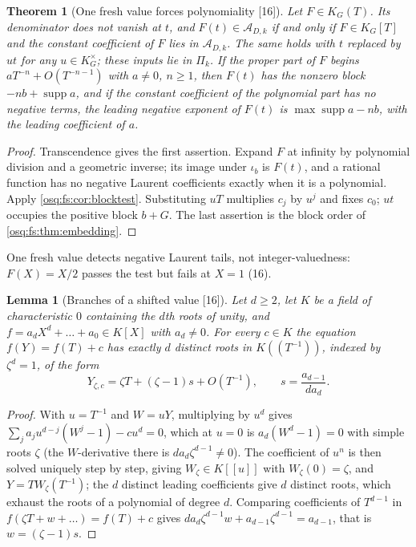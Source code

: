 \documentclass[11pt,letterpaper]{article}
\numberwithin{equation}{section}
\newtheorem{theorem}{Theorem}[section]
\newtheorem{lemma}[lemma]{Lemma}
\theoremstyle{definition}
\theoremstyle{remark}
\theoremstyle{plain}
\newcommand{\A}{\mathcal A}          %
\newcommand{\supp}{\operatorname{supp}}
\newcommand{\src}[1]{\textup{\textsf{[#1]}}}
\begin{document}
\begin{theorem}[One fresh value forces polynomiality \src{16}]\label{osq:fs:thm:onepoint}
Let $F\in K_G(T)$. Its denominator does not vanish at $t$, and $F(t)\in\A_{D,k}$ if and only if $F\in K_G[T]$ and the constant
coefficient of $F$ lies in $\A_{D,k}$. The same holds with $t$ replaced by $ut$ for any $u\in K_G^\times$; these inputs lie in $\Pi_k$.
If the proper part of $F$ begins $aT^{-n}+O(T^{-n-1})$ with $a\ne0$, $n\ge1$, then $F(t)$ has the nonzero block $-nb+\supp a$, and if
the constant coefficient of the polynomial part has no negative terms, the leading negative exponent of $F(t)$ is $\max\supp a-nb$,
with the leading coefficient of $a$.
\end{theorem}
\begin{proof}
Transcendence gives the first assertion. Expand $F$ at infinity by polynomial division and a geometric inverse; its image under $\iota_b$ is
$F(t)$, and a rational function has no negative Laurent coefficients exactly when it is a polynomial. Apply
\cref{osq:fs:cor:blocktest}. Substituting $uT$ multiplies $c_j$ by $u^j$ and fixes $c_0$; $ut$ occupies the positive block $b+G$. The
last assertion is the block order of \cref{osq:fs:thm:embedding}.
\end{proof}

One fresh value detects negative Laurent tails, not integer-valuedness: $F(X)=X/2$ passes the test but fails at $X=1$ (16).

\begin{lemma}[Branches of a shifted value \src{16}]\label{osq:fs:lem:branches}
Let $d\ge2$, let $K$ be a field of characteristic $0$ containing the $d$th roots of unity, and
$f=a_dX^d+\dots+a_0\in K[X]$ with $a_d\ne0$. For every $c\in K$ the equation $f(Y)=f(T)+c$ has exactly $d$ distinct roots in
$K(\!(T^{-1})\!)$, indexed by $\zeta^d=1$, of the form
\[
 Y_{\zeta,c}=\zeta T+(\zeta-1)s+O(T^{-1}),\qquad s=\frac{a_{d-1}}{da_d}.
\]
\end{lemma}
\begin{proof}
With $u=T^{-1}$ and $W=uY$, multiplying by $u^d$ gives $\sum_ja_ju^{d-j}(W^j-1)-cu^d=0$, which at $u=0$ is $a_d(W^d-1)=0$ with simple
roots $\zeta$ (the $W$-derivative there is $da_d\zeta^{d-1}\ne0$). The coefficient of $u^n$ is then solved uniquely step by step, giving
$W_\zeta\in K[[u]]$ with $W_\zeta(0)=\zeta$, and $Y=TW_\zeta(T^{-1})$; the $d$ distinct leading coefficients give $d$ distinct roots, which exhaust
the roots of a polynomial of degree $d$. Comparing coefficients of $T^{d-1}$ in $f(\zeta T+w+\dots)=f(T)+c$ gives
$da_d\zeta^{d-1}w+a_{d-1}\zeta^{d-1}=a_{d-1}$, that is $w=(\zeta-1)s$.
\end{proof}
\end{document}
